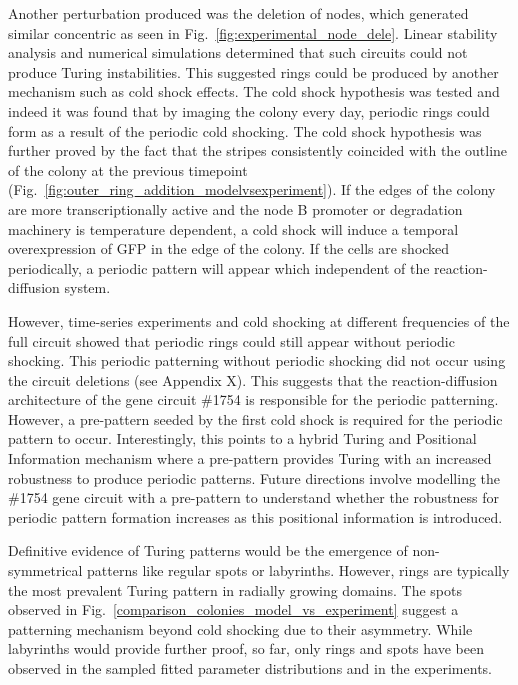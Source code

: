 Another perturbation produced was the deletion of nodes, which generated similar concentric as seen in Fig.~\ref{fig:experimental_node_dele}.
Linear stability analysis and numerical simulations determined that such circuits could not produce Turing instabilities.
This suggested rings could be produced by another mechanism such as cold shock effects.
The cold shock hypothesis was tested and indeed it was found that by imaging the colony every day, periodic rings could form as a result of the periodic cold shocking.
The cold shock hypothesis was further proved by the fact that the stripes consistently coincided with the outline of the colony at the previous timepoint (Fig.~\ref{fig:outer_ring_addition_modelvsexperiment}).
If the edges of the colony are more transcriptionally active and the node B promoter or degradation machinery is temperature dependent, a cold shock will induce a temporal overexpression of GFP in the edge of the colony.
If the cells are shocked periodically, a periodic pattern will appear which independent of the reaction-diffusion system.

However, time-series experiments and cold shocking at different frequencies of the full circuit showed that periodic rings could still appear without periodic shocking.
This periodic patterning without periodic shocking did not occur using the circuit deletions (see Appendix X). %
This suggests that the reaction-diffusion architecture of the gene circuit \#1754 is responsible for the periodic patterning.
However, a pre-pattern seeded by the first cold shock is required for the periodic pattern to occur.
Interestingly, this points to a hybrid Turing and Positional Information mechanism where a pre-pattern provides Turing with an increased robustness to produce periodic patterns.
Future directions involve modelling the \#1754 gene circuit with a pre-pattern to understand whether the robustness for periodic pattern formation increases as this positional information is introduced.

Definitive evidence of Turing patterns would be the emergence of non-symmetrical patterns like regular spots or labyrinths.
However, rings are typically the most prevalent Turing pattern in radially growing domains\parencite{Konow2019}.
The spots observed in Fig.~\ref{comparison_colonies_model_vs_experiment} suggest a patterning mechanism beyond cold shocking due to their asymmetry.
While labyrinths would provide further proof, so far, only rings and spots have been observed in the sampled fitted parameter distributions and in the experiments.



